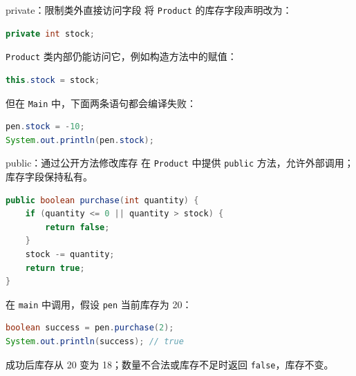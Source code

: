\documentclass[aspectratio=169]{beamer}
\begin{document}
\begin{frame}[fragile]{private：限制类外直接访问字段}
  将 \texttt{Product} 的库存字段声明改为：
  \begin{lstlisting}[language=Java]
private int stock;
  \end{lstlisting}
  \texttt{Product} 类内部仍能访问它，例如构造方法中的赋值：
  \begin{lstlisting}[language=Java]
this.stock = stock;
  \end{lstlisting}
  但在 \texttt{Main} 中，下面两条语句都会编译失败：
  \begin{lstlisting}[language=Java]
pen.stock = -10;
System.out.println(pen.stock);
  \end{lstlisting}
\end{frame}

\begin{frame}[fragile]{public：通过公开方法修改库存}
  在 \texttt{Product} 中提供 \texttt{public} 方法，允许外部调用；库存字段保持私有。
  \begin{lstlisting}[language=Java]
public boolean purchase(int quantity) {
    if (quantity <= 0 || quantity > stock) {
        return false;
    }
    stock -= quantity;
    return true;
}
  \end{lstlisting}
  在 \texttt{main} 中调用，假设 \texttt{pen} 当前库存为 20：
  \begin{lstlisting}[language=Java]
boolean success = pen.purchase(2);
System.out.println(success); // true
  \end{lstlisting}
  成功后库存从 20 变为 18；数量不合法或库存不足时返回 \texttt{false}，库存不变。
\end{frame}
\end{document}
